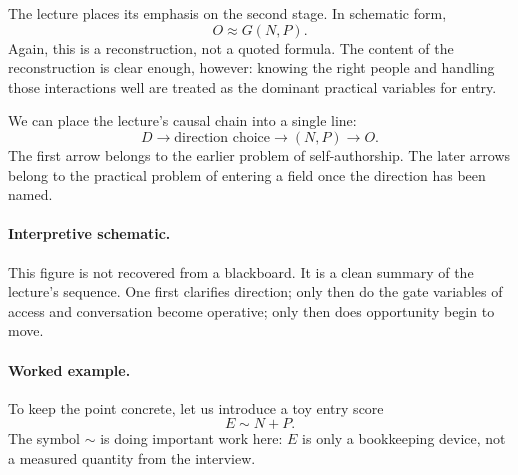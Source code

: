 The lecture places its emphasis on the second stage. In schematic form,
\begin{equation}
O \approx G(N,P).
\end{equation}
Again, this is a reconstruction, not a quoted formula. The content of the reconstruction is clear enough, however: knowing the right people and handling those interactions well are treated as the dominant practical variables for entry.

We can place the lecture's causal chain into a single line:
\begin{equation}
D \longrightarrow \text{direction choice} \longrightarrow (N,P) \longrightarrow O.
\end{equation}
The first arrow belongs to the earlier problem of self-authorship. The later arrows belong to the practical problem of entering a field once the direction has been named.

\begin{figure}[h]
\centering
{}
\end{figure}

\paragraph{Interpretive schematic.}
This figure is not recovered from a blackboard. It is a clean summary of the lecture's sequence. One first clarifies direction; only then do the gate variables of access and conversation become operative; only then does opportunity begin to move.

\paragraph{Worked example.}
To keep the point concrete, let us introduce a toy entry score
\begin{equation}
E \sim N + P.
\end{equation}
The symbol \(\sim\) is doing important work here: \(E\) is only a bookkeeping device, not a measured quantity from the interview.

